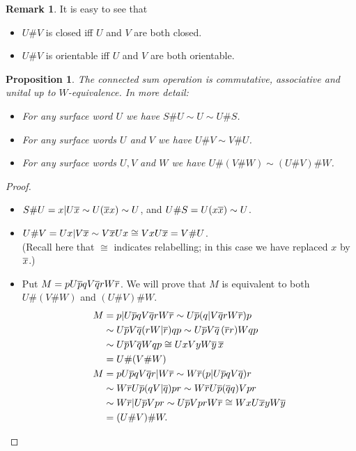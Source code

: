 \documentclass[reqno]{amsart}
\newtheorem{proposition}[theorem]{Proposition}
\theoremstyle{definition}
\newtheorem{remark}[theorem]{Remark}
\begin{document}
\begin{remark}
 It is easy to see that 
 \begin{itemize}
  \item $U\# V$ is closed iff $U$ and $V$ are both closed.
  \item $U\# V$ is orientable iff $U$ and $V$ are both orientable.
 \end{itemize}
\end{remark}

\begin{proposition}\label{prop-sum-monoid}
 The connected sum operation is commutative, associative and unital up
 to $W$-equivalence.  In more detail:
 \begin{itemize}
  \item[(a)] For any surface word $U$ we have $S\# U\sim U\sim U\# S$.
  \item[(b)] For any surface words $U$ and $V$ we have $U\# V\sim V\# U$.
  \item[(c)] For any surface words $U,V$ and $W$ we have
   $U\#(V\# W)\sim(U\# V)\# W$.
 \end{itemize}
\end{proposition}
\begin{proof}\leavevmode
 \begin{itemize}
  \item[(a)] $S\#U=x|U\overline{x}\sim U(\overline{x} x)\sim U$, and $U\#S=U(x\overline{x})\sim U$.
  \item[(b)] $U\#V=Ux|V\overline{x}\sim V\overline{x} Ux\cong VxU\overline{x}=V\# U$.\\  (Recall
   here that $\cong$ indicates relabelling; in this case we have
   replaced $x$ by $\overline{x}$.)
  \item[(c)] Put $M=pU\overline{p} qV\overline{q} rW\overline{r}$.  We will prove that $M$ is
   equivalent to both $U\#(V\# W)$ and $(U\# V)\# W$.
   \begin{align*}
    M &= p|U\overline{p} qV\overline{q} rW\overline{r} 
       \sim U\overline{p}(q|V\overline{q} rW\overline{r})p \\
      &\sim U\overline{p} V\overline{q}(rW|\overline{r})qp 
       \sim U\overline{p} V\overline{q}\,(\overline{r} r)Wqp \\
      &\sim U\overline{p} V\overline{q} Wqp
       \cong UxVy W\overline{y}\,\overline{x} \\
      &= U\#(V\# W) \\
    M &= pU\overline{p} qV\overline{q} r|W\overline{r} 
       \sim W\overline{r} (p|U\overline{p} qV\overline{q}) r \\
      &\sim W\overline{r} U\overline{p} (qV|\overline{q}) p r 
       \sim W\overline{r} U\overline{p}(\overline{q} q) Vpr \\
      &\sim W\overline{r} | U\overline{p} Vpr \sim U\overline{p} Vpr W\overline{r}
       \cong Wx U\overline{x} y W\overline{y} \\
      &= (U\# V)\# W.
   \end{align*}
 \end{itemize}
\end{proof}
\end{document}
